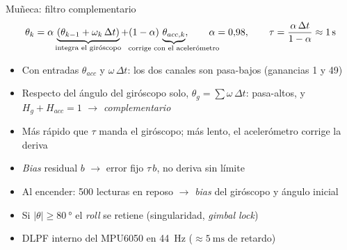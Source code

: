 \documentclass[aspectratio=169,10pt]{beamer}
\begin{document}
\begin{frame}{Muñeca: filtro complementario}
  \[
    \theta_k = \alpha\,\underbrace{\left(\theta_{k-1} + \omega_k\,\Delta t\right)}_{\mathclap{\text{integra el giróscopo}}}
             + (1-\alpha)\,\underbrace{\theta_{acc,k}}_{\mathclap{\text{corrige con el acelerómetro}}},
    \qquad \alpha = 0{,}98,
    \qquad \tau = \frac{\alpha\,\Delta t}{1-\alpha} \approx \SI{1}{\second}
  \]
  \begin{itemize}
    \item Con entradas $\theta_{acc}$ y $\omega\,\Delta t$: los dos canales son pasa-bajos (ganancias 1 y 49)
    \item Respecto del ángulo del giróscopo solo, $\theta_g = \sum \omega\,\Delta t$: \alert{pasa-altos}, y $H_g + H_{acc} = 1$ $\rightarrow$ \emph{complementario}
    \item Más rápido que $\tau$ manda el giróscopo; más lento, el acelerómetro corrige la deriva
    \item \textit{Bias} residual $b$ $\rightarrow$ error fijo $\tau\,b$, no deriva sin límite
    \item Al encender: 500 lecturas en reposo $\rightarrow$ \textit{bias} del giróscopo y ángulo inicial
    \item Si $|\theta| \geq \SI{80}{\degree}$ el \textit{roll} se retiene (singularidad, \textit{gimbal lock})
    \item DLPF interno del MPU6050 en \SI{44}{\hertz} ($\approx\SI{5}{\milli\second}$ de retardo)
  \end{itemize}
\end{frame}
\end{document}
